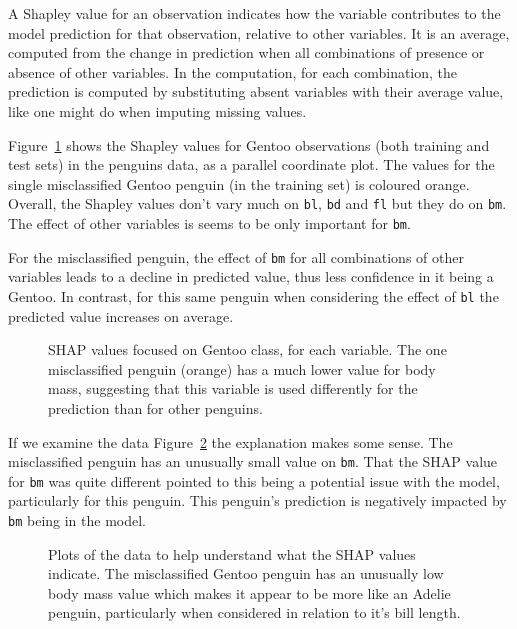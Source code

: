 \documentclass[
  letterpaper,
]{krantz}
\begin{document}
A Shapley value for an observation indicates how the variable
contributes to the model prediction for that observation, relative to
other variables. It is an average, computed from the change in
prediction when all combinations of presence or absence of other
variables. In the computation, for each combination, the prediction is
computed by substituting absent variables with their average value, like
one might do when imputing missing values.

Figure~\ref{fig-shapley-pcp} shows the Shapley values for Gentoo
observations (both training and test sets) in the penguins data, as a
parallel coordinate plot. The values for the single misclassified Gentoo
penguin (in the training set) is coloured orange. Overall, the Shapley
values don't vary much on \texttt{bl}, \texttt{bd} and \texttt{fl} but
they do on \texttt{bm}. The effect of other variables is seems to be
only important for \texttt{bm}.

For the misclassified penguin, the effect of \texttt{bm} for all
combinations of other variables leads to a decline in predicted value,
thus less confidence in it being a Gentoo. In contrast, for this same
penguin when considering the effect of \texttt{bl} the predicted value
increases on average.

\begin{figure}


\caption{\label{fig-shapley-pcp}SHAP values focused on Gentoo class, for
each variable. The one misclassified penguin (orange) has a much lower
value for body mass, suggesting that this variable is used differently
for the prediction than for other penguins.}

\end{figure}%

If we examine the data Figure~\ref{fig-penguins-bl-bm-bd} the
explanation makes some sense. The misclassified penguin has an unusually
small value on \texttt{bm}. That the SHAP value for \texttt{bm} was
quite different pointed to this being a potential issue with the model,
particularly for this penguin. This penguin's prediction is negatively
impacted by \texttt{bm} being in the model.

\begin{figure}


\caption{\label{fig-penguins-bl-bm-bd}Plots of the data to help
understand what the SHAP values indicate. The misclassified Gentoo
penguin has an unusually low body mass value which makes it appear to be
more like an Adelie penguin, particularly when considered in relation to
it's bill length.}

\end{figure}%
\end{document}
